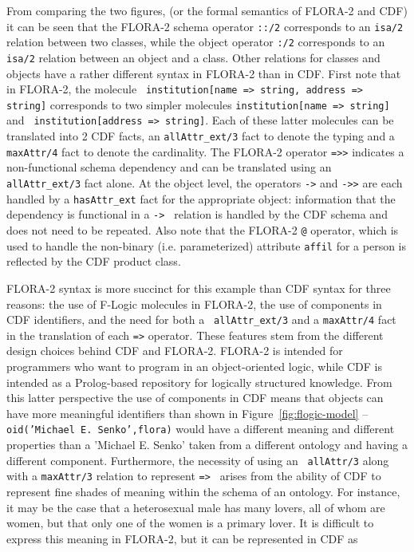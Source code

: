 %
From comparing the two figures, (or
the formal semantics of FLORA-2 and CDF) it can be seen that the
FLORA-2 schema operator {\tt ::/2} corresponds to an {\tt isa/2}
relation between two classes, while the object operator {\tt :/2}
corresponds to an {\tt isa/2} relation between an object and a class.
Other relations for classes and objects have a rather different syntax
in FLORA-2 than in CDF.  First note that in FLORA-2, the molecule {\tt
institution[name => string, address => string]} corresponds to two
simpler molecules {\tt institution[name => string]} and {\tt
institution[address => string]}.  Each of these latter molecules can
be translated into 2 CDF facts, an {\tt allAttr\_ext/3} fact to denote
the typing and a {\tt maxAttr/4} fact to denote the cardinality.  The
FLORA-2 operator {\tt =>>} indicates a non-functional schema
dependency and can be translated using an {\tt allAttr\_ext/3} fact
alone.  At the object level, the operators {\tt ->} and {\tt ->>} are
each handled by a {\tt hasAttr\_ext} fact for the appropriate object:
information that the dependency is functional in a {\tt -> } relation
is handled by the CDF schema and does not need to be repeated.  Also
note that the FLORA-2 {\tt @} operator, which is used to handle the
non-binary (i.e. parameterized) attribute {\tt affil} for a person is
reflected by the CDF product class.

FLORA-2 syntax is more succinct for this example than CDF syntax for
three reasons: the use of F-Logic molecules in FLORA-2, the use of
components in CDF identifiers, and the need for both a {\tt
allAttr\_ext/3} and a {\tt maxAttr/4} fact in the translation of each
{\tt =>} operator.  These features stem from the different design
choices behind CDF and FLORA-2.  FLORA-2 is intended for programmers
who want to program in an object-oriented logic, while CDF is intended
as a Prolog-based repository for logically structured knowledge.  From
this latter perspective the use of components in CDF means that
objects can have more meaningful identifiers than shown in
Figure~\ref{fig:flogic-model} -- {\tt oid('Michael E. Senko',flora)}
would have a different meaning and different properties than a
'Michael E. Senko' taken from a different ontology and having a
different component.  Furthermore, the necessity of using an {\tt
allAttr/3} along with a {\tt maxAttr/3} relation to represent {\tt =>
} arises from the ability of CDF to represent fine shades of meaning
within the schema of an ontology.  For instance, it may be the case
that a heterosexual male has many lovers, all of whom are women, but
that only one of the women is a primary lover.  It is difficult to
express this meaning in FLORA-2, but it can be represented in CDF as

